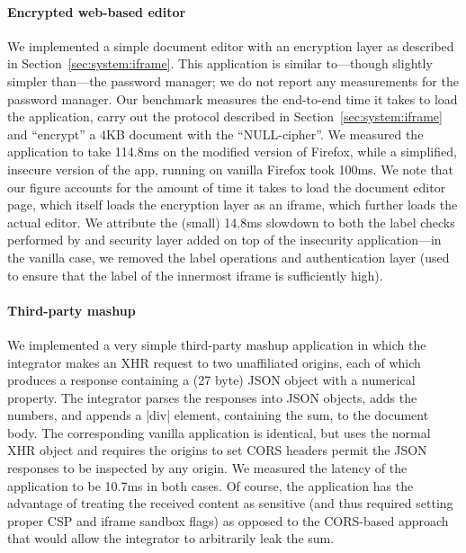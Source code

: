 \paragraph{Encrypted web-based editor}

We implemented a simple document editor with an encryption layer as
described in Section~\ref{sec:system:iframe}.
%
This application is similar to---though slightly simpler than---the
password manager; we do not report any measurements for the
password manager.
%
Our benchmark measures the end-to-end time it takes to load the
application, carry out the protocol described in
Section~\ref{sec:system:iframe}  and ``encrypt'' a 4KB document with
the ``NULL-cipher''.
%
We measured the \sys{} application to take 114.8ms on the modified
version of Firefox, while a simplified, insecure version of the app,
running on vanilla Firefox took 100ms.
%
We note that our figure accounts for the amount of time it takes to
load the document editor page, which itself loads the encryption layer
as an iframe, which further loads the actual editor.
%
We attribute the (small) 14.8ms slowdown to both the label checks
performed by \sys{} and security layer added on top of the insecurity
application---in the vanilla case, we removed the label operations and
authentication layer (used to ensure that the label of the innermost
iframe is sufficiently high).


\paragraph{Third-party mashup}

We implemented a very simple third-party mashup application in which
the integrator makes an XHR request to two unaffiliated origins, each
of which produces a response containing a (27 byte) JSON object with a
numerical property.
%
The integrator parses the responses into JSON objects, adds the
numbers, and appends a \js|div| element, containing the sum, to the
document body.
%
The corresponding vanilla application is identical, but uses the
normal XHR object and requires the origins to set CORS headers permit
the JSON responses to be inspected by any origin.
%
We measured the latency of the application to be 10.7ms in both cases.
%
Of course, the \sys{} application has the advantage of treating the
received content as sensitive (and thus required setting proper CSP
and iframe sandbox flags) as opposed to the CORS-based approach that
would allow the integrator to arbitrarily leak the sum.

